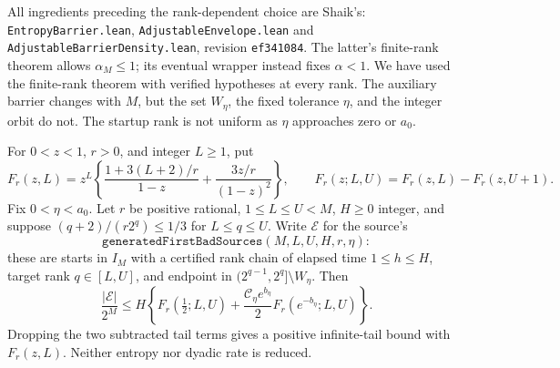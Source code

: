 All ingredients preceding the rank-dependent choice are Shaik's:
\texttt{EntropyBarrier.lean}, \texttt{AdjustableEnvelope.lean} and
\texttt{AdjustableBarrierDensity.lean}, revision \texttt{ef341084}.
The latter's finite-rank theorem allows \(\alpha_M\le1\);
its eventual wrapper instead fixes \(\alpha<1\).
We have used the finite-rank theorem with verified hypotheses at every
rank. The auxiliary barrier changes with \(M\), but the set
\(W_\eta\), the fixed tolerance \(\eta\), and the integer orbit do not.
The startup rank is not uniform as \(\eta\) approaches zero or \(a_0\).

\begin{lemma}
\label{lem:Shaik-entropy-terminal}
For \(0<z<1\), \(r>0\), and integer \(L\ge1\), put
\[
 F_r(z,L)=z^L\left\{
 \frac{1+3(L+2)/r}{1-z}+\frac{3z/r}{(1-z)^2}\right\},
 \qquad
 F_r(z;L,U)=F_r(z,L)-F_r(z,U+1).
\]
Fix \(0<\eta<a_0\). Let \(r\) be positive rational,
\(1\le L\le U<M\), \(H\ge0\) integer,
and suppose \((q+2)/(r2^q)\le1/3\) for \(L\le q\le U\).
Write \(\mathcal E\) for the source's
\[
 \texttt{generatedFirstBadSources}(M,L,U,H,r,\eta):
\]
these are starts in \(I_M\) with a certified rank chain of elapsed time
\(1\le h\le H\), target rank \(q\in[L,U]\), and endpoint in
\((2^{q-1},2^q]\setminus W_\eta\).
Then
\begin{equation}\label{eq:Shaik-entropy-terminal}
 \frac{|\mathcal E|}{2^M}\le
 H\left\{F_r(\tfrac12;L,U)+
     \frac{\mathcal C_\eta e^{b_\eta}}2
                F_r(e^{-b_\eta};L,U)\right\}.
\end{equation}
Dropping the two subtracted tail terms gives a positive infinite-tail
bound with \(F_r(z,L)\). Neither entropy nor dyadic rate is reduced.
\end{lemma}
